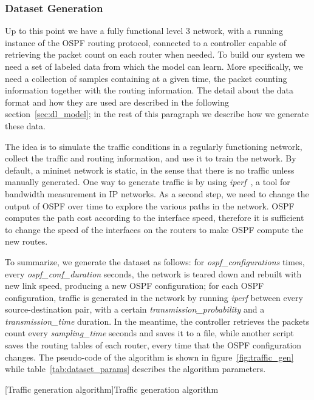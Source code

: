 \subsubsection{Dataset Generation}
Up to this point we have a fully functional level 3 network, with a running instance of the OSPF routing protocol, connected to a controller capable of retrieving the packet count on each router when needed. To build our system we need a set of labeled data from which the model can learn. More specifically, we need a collection of samples containing at a given time, the packet counting information together with the routing information. The detail about the data format and how they are used are described in the following section~\ref{sec:dl_model}; in the rest of this paragraph we describe how we generate these data.

The idea is to simulate the traffic conditions in a regularly functioning network, collect the traffic and routing information, and use it to train the network. By default, a mininet network is static, in the sense that there is no traffic unless manually generated. One way to generate traffic is by using \textit{iperf}~\cite{iperf}, a tool for bandwidth measurement in IP networks.
As a second step, we need to change the output of OSPF over time to explore the various paths in the network. OSPF computes the path cost according to the interface speed, therefore it is sufficient to change the speed of the interfaces on the routers to make OSPF compute the new routes. 

To summarize, we generate the dataset as follows: for \textit{ospf\_configurations} times, every \textit{ospf\_conf\_duration} seconds, the network is teared down and rebuilt with new link speed, producing a new OSPF configuration; for each OSPF configuration, traffic is generated in the network by running \textit{iperf} between every source-destination pair, with a certain \textit{transmission\_probability} and a \textit{transmission\_time} duration. In the meantime, the controller retrieves the packets count every \textit{sampling\_time} seconds and saves it to a file, while another script saves the routing tables of each router, every time that the OSPF configuration changes. The pseudo-code of the algorithm is shown in figure~\ref{fig:traffic_gen} while table~\ref{tab:dataset_params} describes the algorithm parameters.

\begin{algorithm}
[Traffic generation algorithm]{Traffic generation algorithm}\label{fig:traffic_gen}
\begin{algorithmic}
		\ENDIF
	\ENDFOR{}
\ENDFOR
\end{algorithmic}
\end{algorithm}

